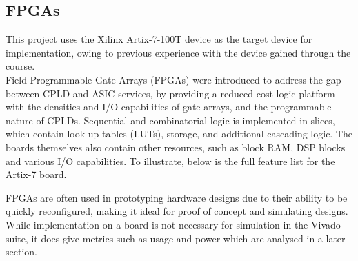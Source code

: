 \subsection{FPGAs}
\label{sec:bgrw-fpga}
\noindent This project uses the Xilinx Artix-7-100T device as the target device for implementation, owing to previous experience with the 
device gained through the course. \\

\noindent Field Programmable Gate Arrays (FPGAs) were introduced to address the gap between CPLD and ASIC services, by providing a 
reduced-cost logic platform with the densities and I/O capabilities of gate arrays, and the programmable nature of CPLDs. Sequential and 
combinatorial logic is implemented in slices, which contain look-up tables (LUTs), storage, and additional cascading logic. The boards 
themselves also contain other resources, such as block RAM, DSP blocks and various I/O capabilities. To illustrate, below is the full 
feature list for the Artix-7 board. \\

\begin{table}[H] 
\begin{adjustwidth}{-2.2cm}{-1.5cm}
\end{adjustwidth}
    \caption{Table showing the resources available on the Xilinx Artix-7-100T device. Note: CLBs are Configurable Logic Blocks, DSP48E1 are 
    the DSP slices, each containing a pre-adder, a 25 x 18 multiplier, an adder, and an accumulator, CMTs are Clock Management Tiles, GTPs 
    are low-power Gigabit Transceivers, and XADC is the user configurable analog interface.}
    \label{table:fpga}
\end{table}


\noindent FPGAs are often used in prototyping hardware designs due to their ability to be quickly reconfigured, making it ideal for proof 
of concept and simulating designs. While implementation on a board is not necessary for simulation in the Vivado suite, it does give 
metrics such as usage and power which are analysed in a later section. \\

